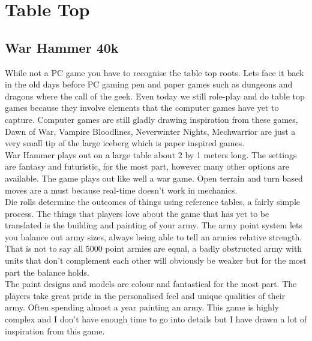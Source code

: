 \documentclass[a4paper]{article}
\begin{document}
\section{Table Top}
\subsection{War Hammer 40k}
While not a PC game you have to recognise the table top roots. Lets face it back in the old days before PC gaming pen and paper games such as dungeons and dragons where the call of the geek. Even today we still role-play and do table top games because they involve elements that the computer games have yet to capture. Computer games are still gladly drawing inspiration from these games, Dawn of War, Vampire Bloodlines, Neverwinter Nights, Mechwarrior are just a very small tip of the large iceberg which is paper inspired games.\\
War Hammer plays out on a large table about 2 by 1 meters long. The settings are fantasy and futuristic, for the most part, however many other options are available. The game plays out like well a war game. Open terrain and turn based moves are a must because real-time doesn't work in mechanics.\\
Die rolls determine the outcomes of things using reference tables, a fairly simple process. The things that players love about the game that has yet to be translated is the building and painting of your army. The army point system lets you balance out army sizes, always being able to tell an armies relative strength. That is not to say all 5000 point armies are equal, a badly obstructed army with units that don't complement each other will obviously be weaker but for the most part the balance holds.\\
The paint designs and models are colour and fantastical for the most part. The players take great pride in the personalised feel and unique qualities of their army. Often spending almost a year painting an army. This game is highly complex and I don't have enough time to go into details but I have drawn a lot of inspiration from this game.
\end{document}
